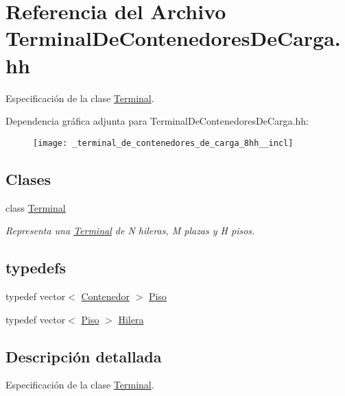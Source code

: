 \hypertarget{_terminal_de_contenedores_de_carga_8hh}{}\section{Referencia del Archivo Terminal\+De\+Contenedores\+De\+Carga.\+hh}
\label{_terminal_de_contenedores_de_carga_8hh}


Especificación de la clase \hyperlink{class_terminal}{Terminal}.  


Dependencia gráfica adjunta para Terminal\+De\+Contenedores\+De\+Carga.\+hh\+:
\nopagebreak
\begin{figure}[H]
\begin{center}
\leavevmode
\texttt{[image: \_terminal\_de\_contenedores\_de\_carga\_8hh\_\_incl]}
\end{center}
\end{figure}
\subsection*{Clases}
\begin{DoxyCompactItemize}
\item 
class \hyperlink{class_terminal}{Terminal}
\begin{DoxyCompactList}\small\item\em Representa una \hyperlink{class_terminal}{Terminal} de N hileras, M plazas y H pisos. \end{DoxyCompactList}\end{DoxyCompactItemize}
\subsection*{typedefs}
\begin{DoxyCompactItemize}
\item 
typedef vector$<$ \hyperlink{class_contenedor}{Contenedor} $>$ \hyperlink{_terminal_de_contenedores_de_carga_8hh_a07b661e3bf5c0eec5886bbbbeb4e1bc3}{Piso}
\item 
typedef vector$<$ \hyperlink{_terminal_de_contenedores_de_carga_8hh_a07b661e3bf5c0eec5886bbbbeb4e1bc3}{Piso} $>$ \hyperlink{_terminal_de_contenedores_de_carga_8hh_a9575a014a12d19251cec39cff90efa73}{Hilera}
\end{DoxyCompactItemize}


\subsection{Descripción detallada}
Especificación de la clase \hyperlink{class_terminal}{Terminal}. 

